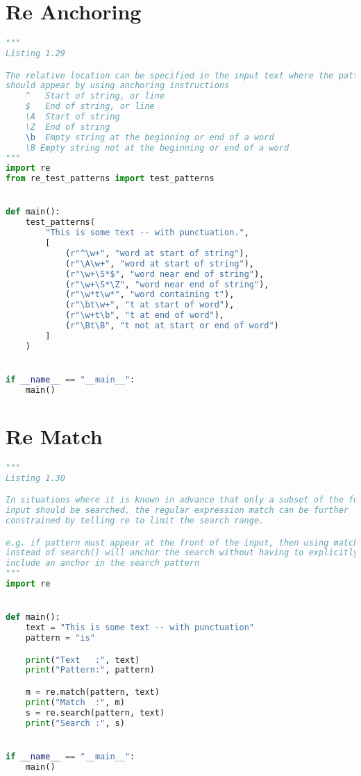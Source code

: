 \documentclass[a4paper,landscape]{report}
\begin{document}
\section{Re Anchoring}
\begin{lstlisting}[language=Python]
"""
Listing 1.29

The relative location can be specified in the input text where the pattern
should appear by using anchoring instructions
    ^   Start of string, or line
    $   End of string, or line
    \A  Start of string
    \Z  End of string
    \b  Empty string at the beginning or end of a word
    \B Empty string not at the beginning or end of a word
"""
import re
from re_test_patterns import test_patterns


def main():
    test_patterns(
        "This is some text -- with punctuation.",
        [
            (r"^\w+", "word at start of string"),
            (r"\A\w+", "word at start of string"),
            (r"\w+\S*$", "word near end of string"),
            (r"\w+\S*\Z", "word near end of string"),
            (r"\w*t\w*", "word containing t"),
            (r"\bt\w+", "t at start of word"),
            (r"\w+t\b", "t at end of word"),
            (r"\Bt\B", "t not at start or end of word")
        ]
    )


if __name__ == "__main__":
    main()

\end{lstlisting}
\section{Re Match}
\begin{lstlisting}[language=Python]
"""
Listing 1.30

In situations where it is known in advance that only a subset of the full
input should be searched, the regular expression match can be further
constrained by telling re to limit the search range.

e.g. if pattern must appear at the front of the input, then using match()
instead of search() will anchor the search without having to explicitly
include an anchor in the search pattern
"""
import re


def main():
    text = "This is some text -- with punctuation"
    pattern = "is"

    print("Text   :", text)
    print("Pattern:", pattern)

    m = re.match(pattern, text)
    print("Match  :", m)
    s = re.search(pattern, text)
    print("Search :", s)


if __name__ == "__main__":
    main()

\end{lstlisting}
\end{document}
